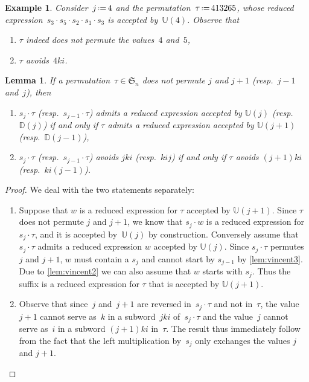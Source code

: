 \documentclass{amsart}
\newtheorem{lemma}[theorem]{Lemma}
\newtheorem{example}[theorem]{Example}
\newcommand{\fS}{\mathfrak{S}} %
\newcommand{\eqdef}{\mbox{\,\raisebox{0.2ex}{\scriptsize\ensuremath{\mathrm:}}\ensuremath{=}\,}} %
\newcommand{\automatonU}{\mathbb{U}} %
\newcommand{\automatonD}{\mathbb{D}} %
\begin{document}
\begin{example}\label{exm:lemVincent3}
Consider~$j \eqdef 4$ and the permutation~$\tau \eqdef 413265$, whose reduced expression~$s_3 \cdot s_5 \cdot s_2 \cdot s_1 \cdot s_3$ is accepted by~$\automatonU(4)$.
Observe that
\begin{enumerate}
	\item $\tau$ indeed does not permute the values~$4$ and~$5$,
	\item $\tau$ avoids~$4ki$.
\end{enumerate}
\end{example}

\begin{lemma}\label{lem:vincent4}
If a permutation~$\tau \in \fS_n$ does not permute $j$ and $j+1$ (resp.~$j-1$ and~$j$), then
\begin{enumerate} 
	\item $s_j \cdot \tau$ (resp.~$s_{j-1} \cdot \tau$) admits a reduced expression accepted by $\automatonU(j)$ (resp.~$\automatonD(j)$) if and only if $\tau$ admits a reduced expression accepted by $\automatonU(j+1)$ (resp.~$\automatonD(j-1)$),
	\item $s_j \cdot \tau$ (resp.~$s_{j-1} \cdot \tau$) avoids $jki$ (resp.~$kij$) if and only if $\tau$ avoids $(j+1)ki$ (resp.~$ki(j-1)$).
\end{enumerate}
\end{lemma}

\pagebreak
\begin{proof}
We deal with the two statements separately:
\begin{enumerate} 
	\item Suppose that $w$ is a reduced expression for $\tau$ accepted by $\automatonU(j+1)$. Since $\tau$ does not permute $j$ and $j+1$, we know that $s_j \cdot w$ is a reduced expression for~$s_j \cdot \tau$, and it is accepted by~$\automatonU(j)$ by construction. Conversely assume that $s_j \cdot \tau$ admits a reduced expression $w$ accepted by $\automatonU(j)$. Since $s_j \cdot \tau$ permutes $j$ and $j+1$, $w$ must contain a $s_j$ and cannot start by $s_{j-1}$ by \cref{lem:vincent3}. Due to \cref{lem:vincent2} we can also assume that $w$ starts with $s_j$. Thus the suffix is a reduced expression for $\tau$ that is accepted by $\automatonU(j+1)$.
	\item Observe that since~$j$ and~$j+1$ are reversed in~$s_j \cdot \tau$ and not in~$\tau$, the value $j+1$ cannot serve as~$k$ in a subword~$jki$ of~$s_j \cdot \tau$ and the value~$j$ cannot serve as~$i$ in a subword $(j+1)ki$ in~$\tau$. The result thus immediately follow from the fact that the left multiplication by~$s_j$ only exchanges the values $j$ and $j+1$.
	\qedhere
\end{enumerate}
\end{proof}
\end{document}
